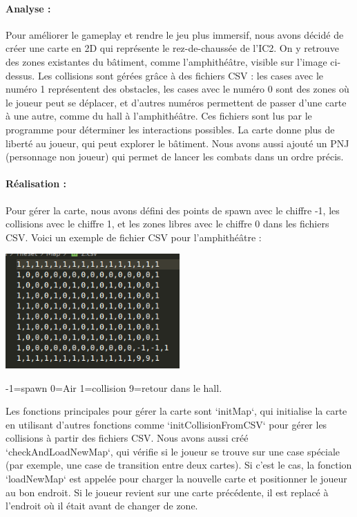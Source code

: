 \documentclass[12pt,a4paper, twoside]{article}
\begin{document}
    \paragraph{Analyse : }
   
    Pour améliorer le gameplay et rendre le jeu plus immersif, nous avons décidé de créer une carte en 2D qui représente le rez-de-chaussée de l'IC2. On y retrouve des zones existantes du bâtiment, comme l'amphithéâtre, visible sur l'image ci-dessus. Les collisions sont gérées grâce à des fichiers CSV : les cases avec le numéro 1 représentent des obstacles, les cases avec le numéro 0 sont des zones où le joueur peut se déplacer, et d'autres numéros permettent de passer d'une carte à une autre, comme du hall à l'amphithéâtre. Ces fichiers sont lus par le programme pour déterminer les interactions possibles. La carte donne plus de liberté au joueur, qui peut explorer le bâtiment. Nous avons aussi ajouté un PNJ (personnage non joueur) qui permet de lancer les combats dans un ordre précis.
    \newline
    \paragraph{Réalisation : }
    Pour gérer la carte, nous avons défini des points de spawn avec le chiffre -1, les collisions avec le chiffre 1, et les zones libres avec le chiffre 0 dans les fichiers CSV. Voici un exemple de fichier CSV pour l'amphithéâtre :
    \begin{center}
    \includegraphics[width=0.5\textwidth]{hall.png}
    \end{center}
    \begin{center}
        \small{-1=spawn 0=Air 1=collision 9=retour dans le hall.}
    \end{center}
    
    Les fonctions principales pour gérer la carte sont `initMap`, qui initialise la carte en utilisant d'autres fonctions comme `initCollisionFromCSV` pour gérer les collisions à partir des fichiers CSV. Nous avons aussi créé `checkAndLoadNewMap`, qui vérifie si le joueur se trouve sur une case spéciale (par exemple, une case de transition entre deux cartes). Si c'est le cas, la fonction `loadNewMap` est appelée pour charger la nouvelle carte et positionner le joueur au bon endroit. Si le joueur revient sur une carte précédente, il est replacé à l'endroit où il était avant de changer de zone.
\end{document}
